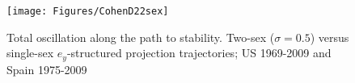 \begin{figure}[ht!]
        \centering  
          \caption{Total oscillation along the path to
       stability. Two-sex ($\sigma = 0.5$) versus single-sex $e_y$-structured
       projection trajectories; US 1969-2009 and Spain 1975-2009}
           \texttt{[image: Figures/CohenD22sex]}
          \label{fig:cohend22sex}
\end{figure}
 \FloatBarrier





